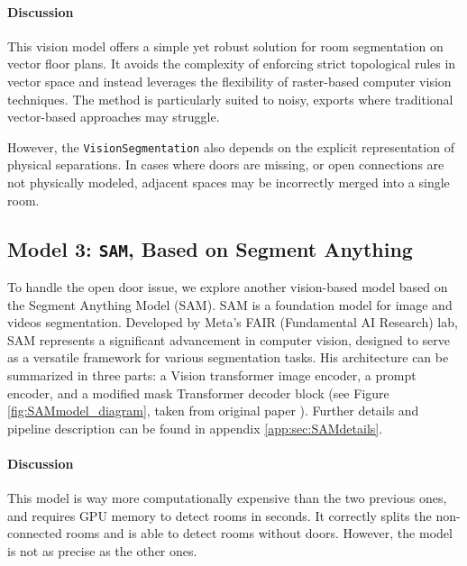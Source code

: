\documentclass[11pt]{article}
\begin{document}
\paragraph{Discussion}
This vision model offers a simple yet robust solution for room segmentation on 
vector floor plans. It avoids the complexity of enforcing strict topological 
rules in vector space and instead leverages the flexibility of raster-based computer 
vision techniques. The method is particularly suited to noisy, exports where 
traditional vector-based approaches may struggle.

However, the \texttt{VisionSegmentation} also depends on the explicit representation of physical separations. 
In cases where doors are missing, or open connections are not physically modeled, 
adjacent spaces may be incorrectly merged into a single room.


\subsection{Model 3: \texttt{SAM}, Based on Segment Anything}
To handle the open door issue, we explore another vision-based model 
based on the Segment Anything Model 
(SAM)\cite{kirillov2023segment}. SAM is a foundation model for image and videos segmentation. Developed by 
Meta's FAIR (Fundamental AI Research) lab, SAM represents a significant advancement 
in computer vision, designed to serve as a versatile framework for various 
segmentation tasks. His architecture can be summarized in three parts: a Vision 
transformer image encoder, a prompt encoder, and a modified mask Transformer decoder
 block (see Figure \ref{fig:SAMmodel_diagram}, taken from original paper \cite{kirillov2023segment}).
 Further details and pipeline description 
 can be found in appendix \ref{app:sec:SAMdetails}. 

\paragraph{Discussion}
This model is way more computationally expensive than the two previous ones, 
and requires GPU memory to detect rooms in seconds. It correctly splits
the non-connected rooms and is able to detect rooms without doors.
However, the model is not as precise as the other ones.


\end{document}

